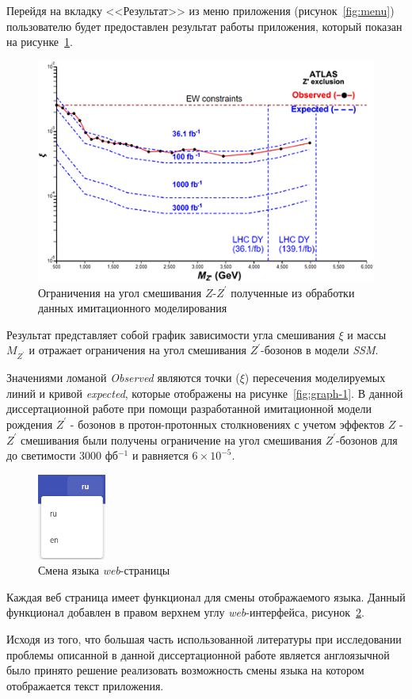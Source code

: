 Перейдя на вкладку <<Результат>> из меню приложения (рисунок~\ref{fig:menu}) пользователю будет предоставлен результат работы приложения, который показан на рисунке~\ref{fig:graph-result}.

\begin{figure}[!h]
	\centering
	\includegraphics[width=\textwidth]{figures/graph-result.png}
	\caption{Ограничения на угол смешивания $Z$-${Z}^{\prime}$ полученные из обработки данных имитационного моделирования}
	\label{fig:graph-result}
\end{figure}

Результат представляет собой график зависимости угла смешивания $\xi$ и массы ${M}_{{Z}^{\prime}}$ и отражает ограничения на угол смешивания ${Z}^{\prime}$-бозонов в модели \textit{SSM}. 

Значениями ломаной \textit{Observed} являются точки ($\xi$) пересечения моделируемых линий и кривой \textit{expected}, которые отображены на рисунке~\ref{fig:graph-1}. В данной диссертационной работе при помощи разработанной имитационной модели рождения $Z^\prime$ - бозонов в протон-протонных столкновениях с учетом эффектов $Z$ - $Z^\prime$ смешивания были получены ограничение на угол смешивания ${Z}^{\prime}$-бозонов для до светимости 3000 фб${}^{−1}$ и равняется $6\times{10}^{-5}$.


\begin{figure}[!h]
	\centering
	\includegraphics[width=0.2\textwidth]{figures/language-switch.png}
	\caption{Смена языка \textit{web}-страницы}
	\label{fig:language-switch}
\end{figure}

Каждая веб страница имеет функционал для смены отображаемого языка. Данный функционал добавлен в правом верхнем углу \textit{web}-интерфейса, рисунок~\ref{fig:language-switch}.

Исходя из того, что большая часть использованной литературы при исследовании проблемы описанной в данной диссертационной работе является англоязычной было принято решение реализовать возможность смены языка на котором отображается текст приложения.

